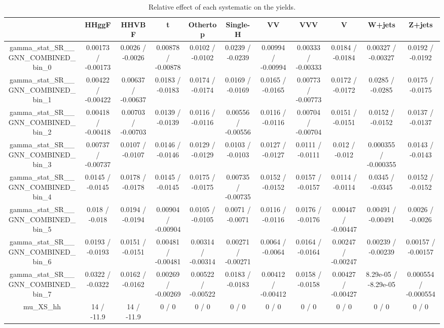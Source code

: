 \documentclass[10pt]{article}
\begin{document}
\begin{table}[htbp]
\begin{center}
\begin{tabular}{|c|c|c|c|c|c|c|c|c|c|c|}
\hline 
      & HHggF      & HHVBF      & t      & Othertop      & Single-H      & VV      & VVV      & V      & W+jets      & Z+jets \\ 
\hline 
  gamma_stat_SR__GNN_COMBINED_bin_0 & 0.00173 / -0.00173 & 0.0026 / -0.0026 & 0.00878 / -0.00878 & 0.0102 / -0.0102 & 0.0239 / -0.0239 & 0.00994 / -0.00994 & 0.00333 / -0.00333 & 0.0184 / -0.0184 & 0.00327 / -0.00327 & 0.0192 / -0.0192 \\ 
  gamma_stat_SR__GNN_COMBINED_bin_1 & 0.00422 / -0.00422 & 0.00637 / -0.00637 & 0.0183 / -0.0183 & 0.0174 / -0.0174 & 0.0169 / -0.0169 & 0.0165 / -0.0165 & 0.00773 / -0.00773 & 0.0172 / -0.0172 & 0.0285 / -0.0285 & 0.0175 / -0.0175 \\ 
  gamma_stat_SR__GNN_COMBINED_bin_2 & 0.00418 / -0.00418 & 0.00703 / -0.00703 & 0.0139 / -0.0139 & 0.0116 / -0.0116 & 0.00556 / -0.00556 & 0.0116 / -0.0116 & 0.00704 / -0.00704 & 0.0151 / -0.0151 & 0.0152 / -0.0152 & 0.0137 / -0.0137 \\ 
  gamma_stat_SR__GNN_COMBINED_bin_3 & 0.00737 / -0.00737 & 0.0107 / -0.0107 & 0.0146 / -0.0146 & 0.0129 / -0.0129 & 0.0103 / -0.0103 & 0.0127 / -0.0127 & 0.0111 / -0.0111 & 0.012 / -0.012 & 0.000355 / -0.000355 & 0.0143 / -0.0143 \\ 
  gamma_stat_SR__GNN_COMBINED_bin_4 & 0.0145 / -0.0145 & 0.0178 / -0.0178 & 0.0145 / -0.0145 & 0.0175 / -0.0175 & 0.00735 / -0.00735 & 0.0152 / -0.0152 & 0.0157 / -0.0157 & 0.0114 / -0.0114 & 0.0345 / -0.0345 & 0.0152 / -0.0152 \\ 
  gamma_stat_SR__GNN_COMBINED_bin_5 & 0.018 / -0.018 & 0.0194 / -0.0194 & 0.00904 / -0.00904 & 0.0105 / -0.0105 & 0.0071 / -0.0071 & 0.0116 / -0.0116 & 0.0176 / -0.0176 & 0.00447 / -0.00447 & 0.00491 / -0.00491 & 0.0026 / -0.0026 \\ 
  gamma_stat_SR__GNN_COMBINED_bin_6 & 0.0193 / -0.0193 & 0.0151 / -0.0151 & 0.00481 / -0.00481 & 0.00314 / -0.00314 & 0.00271 / -0.00271 & 0.0064 / -0.0064 & 0.0164 / -0.0164 & 0.00247 / -0.00247 & 0.00239 / -0.00239 & 0.00157 / -0.00157 \\ 
  gamma_stat_SR__GNN_COMBINED_bin_7 & 0.0322 / -0.0322 & 0.0162 / -0.0162 & 0.00269 / -0.00269 & 0.00522 / -0.00522 & 0.0183 / -0.0183 & 0.00412 / -0.00412 & 0.0158 / -0.0158 & 0.00427 / -0.00427 & 8.29e-05 / -8.29e-05 & 0.000554 / -0.000554 \\ 
  mu_XS_hh & 14 / -11.9 & 14 / -11.9 & 0 / 0 & 0 / 0 & 0 / 0 & 0 / 0 & 0 / 0 & 0 / 0 & 0 / 0 & 0 / 0 \\ 
\hline 
\end{tabular} 
\caption{Relative effect of each systematic on the yields.} 
\end{center} 
\end{table} 
\end{document}
